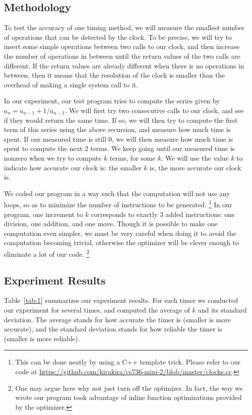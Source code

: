 \documentclass[11pt,conference]{IEEEtran}
\begin{document}
\subsection{Methodology}
To test the accuracy of one timing method, we will measure the smallest number of operations that can be detected by the clock.
To be precise, we will try to insert some simple operations between two calls to our clock, and then increase the number of operations in between until the return values of the two calls are different.
If the return values are already different when there is no operations in between, then it means that the resolution of the clock is smaller than the overhead of making a single system call to it.

In our experiment, our test program tries to compute the series given by $a_n=a_{n-1}+1/a_{n-1}$.
We will first try two consecutive calls to our clock, and see if they would return the same time.
If so, we will then try to compute the first term of this series using the above recursion, and measure how much time is spent.
If our measured time is still $0$, we will then measure how much time is spent to compute the next $2$ terms.
We keep going until our measured time is nonzero when we try to compute $k$ terms, for some $k$.
We will use the value $k$ to indicate how accurate our clock is: the smaller $k$ is, the more accurate our clock is.

We coded our program in a way such that the computation will not use any loops, so as to minimize the number of instructions to be generated.
\footnote{This can be done neatly by using a C++ template trick.
Please refer to our code at \url{https://github.com/kirakira/cs736-mini-2/blob/master/clocks.cc}.}
In our program, one increment to $k$ corresponds to exactly $3$ added instructions: one division, one addition, and one move.
Though it is possible to make one computation even simpler, we must be very careful when doing it to avoid the computation becoming trivial, otherwise the optimizer will be clever enough to eliminate a lot of our code.
\footnote{One may argue here why not just turn off the optimizer.
In fact, the way we wrote our program took advantage of inline function optimizations provided by the optimizer.}

\subsection{Experiment Results}
Table~\ref{tab:1} summarizes our experiment results.
For each timer we conducted our experiment for several times, and computed the average of $k$ and its standard deviation.
The average stands for how accurate the timer is (smaller is more accurate), and the standard deviation stands for how reliable the timer is (smaller is more reliable).
\end{document}
